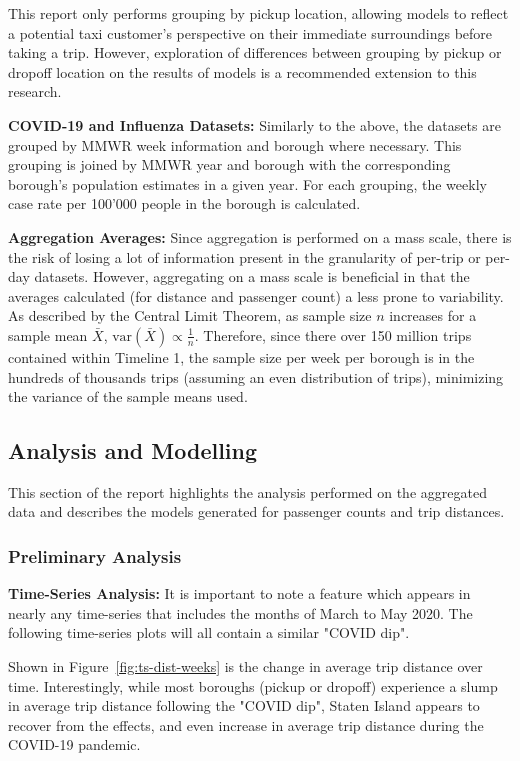 \documentclass[11pt]{article}
\begin{document}
This report only performs grouping by pickup location,
allowing models to reflect a potential taxi customer's perspective on their immediate surroundings before taking a trip.
However, exploration of differences between grouping by pickup or dropoff location on the results of models 
is a recommended extension to this research.

\textbf{COVID-19 and Influenza Datasets:}
Similarly to the above, the datasets are grouped by MMWR week information and borough where necessary.
This grouping is joined by MMWR year and borough with the corresponding borough's population estimates in a given year.
For each grouping, the weekly case rate per 100'000 people in the borough is calculated.

\textbf{Aggregation Averages:}
Since aggregation is performed on a mass scale, there is the risk of losing a lot of information present in the granularity of per-trip or per-day datasets.
However, aggregating on a mass scale is beneficial in that the averages calculated (for distance and passenger count)
a less prone to variability. As described by the Central Limit Theorem, as sample size $n$ increases for a sample mean $\bar{X}$, 
$\text{var}(\bar{X}) \propto \frac{1}{n}$. Therefore, since there over 150 million trips contained within Timeline 1, the sample size per week per borough is in the hundreds of thousands trips (assuming an even distribution of trips),
minimizing the variance of the sample means used.

\subsection{Analysis and Modelling}

This section of the report highlights the analysis performed on the aggregated data
and describes the models generated for passenger counts and trip distances.

\subsubsection{Preliminary Analysis}

\textbf{Time-Series Analysis:}
It is important to note 
a feature which appears in nearly any time-series that includes 
the months of March to May 2020. 
The following time-series plots will all contain a similar "COVID dip".

Shown in Figure~\ref{fig:ts-dist-weeks} is the change in average trip distance over time. Interestingly, 
while most boroughs (pickup or dropoff) experience a slump in average trip distance following the "COVID dip", 
Staten Island appears to recover from the effects, and even increase in average trip distance
during the COVID-19 pandemic.
\end{document}
